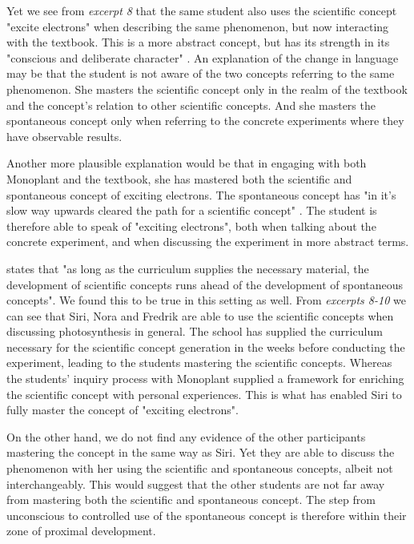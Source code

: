 Yet we see from \emph{excerpt 8} that the same student also uses the scientific concept "excite electrons" when describing the same phenomenon, but now interacting with the textbook. This is a more abstract concept, but has its strength in its "conscious and deliberate character" \citep{vygotsky2012thought}. An explanation of the change in language may be that the student is not aware of the two concepts referring to the same phenomenon. She masters the scientific concept only in the realm of the textbook and the concept's relation to other scientific concepts. And she masters the spontaneous concept only when referring to the concrete experiments where they have observable results. 

Another more plausible explanation would be that in engaging with both Monoplant and the textbook, she has mastered both the scientific and spontaneous concept of exciting electrons. The spontaneous concept has "in it's slow way upwards cleared the path for a scientific concept" \citep{vygotsky2012thought}. The student is therefore able to speak of "exciting electrons", both when talking about the concrete experiment, and when discussing the experiment in more abstract terms. 

\citet{vygotsky2012thought} states that "as long as the curriculum supplies the necessary material, the development of scientific concepts runs ahead of the development of spontaneous concepts". We found this to be true in this setting as well. From \emph{excerpts 8-10} we can see that Siri, Nora and Fredrik are able to use the scientific concepts when discussing photosynthesis in general. The school has supplied the curriculum necessary for the scientific concept generation in the weeks before conducting the experiment, leading to the students mastering the scientific concepts. Whereas the students' inquiry process with Monoplant supplied a framework for enriching the scientific concept with personal experiences. This is what has enabled Siri to fully master the concept of "exciting electrons".  

On the other hand, we do not find any evidence of the other participants mastering the concept in the same way as Siri. Yet they are able to discuss the phenomenon with her using the scientific and spontaneous concepts, albeit not interchangeably. This would suggest that the other students are not far away from mastering both the scientific and spontaneous concept. The step from unconscious to controlled use of the spontaneous concept is therefore within their zone of proximal development. 

